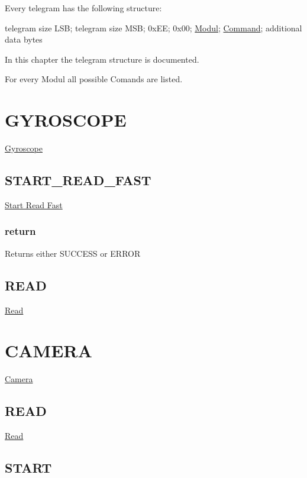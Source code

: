 Every telegram has the following structure\-:\par
 telegram size L\-S\-B; telegram size M\-S\-B; 0x\-E\-E; 0x00; \hyperlink{modul_doc_modulDocAnchor}{Modul}; \hyperlink{cmd_doc_cmdDocAnchor}{Command}; additional data bytes\par
 \par
 In this chapter the telegram structure is documented.\par
 For every Modul all possible Comands are listed.\hypertarget{cmd_structure_GYROSCOPE}{}\section{G\-Y\-R\-O\-S\-C\-O\-P\-E}\label{cmd_structure_GYROSCOPE}
\hyperlink{modul_doc_Gyroscope}{Gyroscope}\hypertarget{cmd_structure_GYROSCOPE_START_READ_FAST}{}\subsection{S\-T\-A\-R\-T\-\_\-\-R\-E\-A\-D\-\_\-\-F\-A\-S\-T}\label{cmd_structure_GYROSCOPE_START_READ_FAST}
\hyperlink{cmd_doc_StartReadFast}{Start Read Fast}\hypertarget{cmd_structure_GYROSCOPE_START_READ_FAST_RETURN}{}\subsubsection{return}\label{cmd_structure_GYROSCOPE_START_READ_FAST_RETURN}
Returns either S\-U\-C\-C\-E\-S\-S or E\-R\-R\-O\-R\hypertarget{cmd_structure_GYROSCOPE_READ}{}\subsection{R\-E\-A\-D}\label{cmd_structure_GYROSCOPE_READ}
\hyperlink{cmd_doc_Read}{Read}\hypertarget{cmd_structure_CAMERA}{}\section{C\-A\-M\-E\-R\-A}\label{cmd_structure_CAMERA}
\hyperlink{modul_doc_Camera}{Camera}\hypertarget{cmd_structure_CAMERA_READ}{}\subsection{R\-E\-A\-D}\label{cmd_structure_CAMERA_READ}
\hyperlink{cmd_doc_Read}{Read}\hypertarget{cmd_structure_CAMERA_START}{}\subsection{S\-T\-A\-R\-T}\label{cmd_structure_CAMERA_START}
